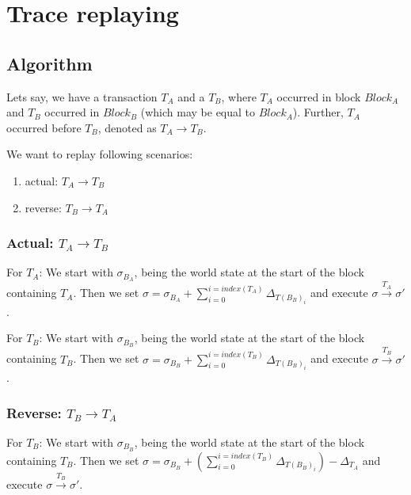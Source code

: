 \documentclass[draft,final]{vutinfth} %
\begin{document}

\section{Trace replaying}

\subsection{Algorithm}

Lets say, we have a transaction $T_A$ and a $T_B$, where $T_A$ occurred in block $Block_A$ and $T_B$ occurred in $Block_B$ (which may be equal to $Block_A$). Further, $T_A$ occurred before $T_B$, denoted as $T_A \rightarrow T_B$.

We want to replay following scenarios:

\begin{enumerate}
    \item actual: $T_A \rightarrow T_B$
    \item reverse: $T_B \rightarrow T_A$
\end{enumerate}

\subsubsection{Actual: $T_A \rightarrow T_B$}

For $T_A$: We start with $\sigma_{B_A}$, being the world state at the start of the block containing $T_A$. Then we set $\sigma = \sigma_{B_A} + \sum_{i=0}^{i=index(T_A)}\Delta_{T(B_B)_i}$ and execute $\sigma \xrightarrow{T_A} \sigma\prime$.

For $T_B$: We start with $\sigma_{B_B}$, being the world state at the start of the block containing $T_B$. Then we set $\sigma = \sigma_{B_B} + \sum_{i=0}^{i=index(T_B)}\Delta_{T(B_B)_i}$ and execute $\sigma \xrightarrow{T_B} \sigma\prime$.

\subsubsection{Reverse: $T_B \rightarrow T_A$}


For $T_B$: We start with $\sigma_{B_B}$, being the world state at the start of the block containing $T_B$. Then we set $\sigma = \sigma_{B_B} + (\sum_{i=0}^{i=index(T_B)}\Delta_{T(B_B)_i}) - \Delta_{T_A}$ and execute $\sigma \xrightarrow{T_B} \sigma\prime$.
\end{document}
